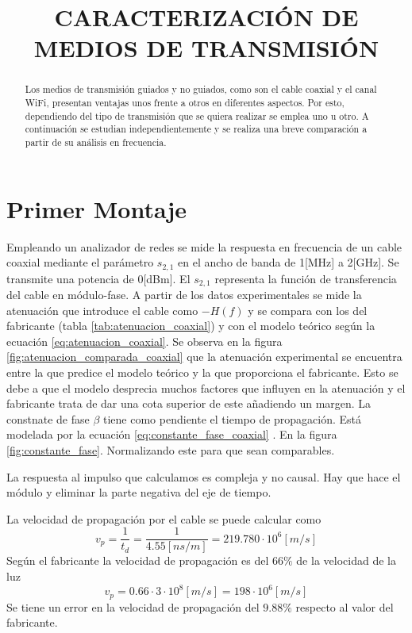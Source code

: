\documentclass[10pt,conference,a4paper]{IEEEtran}
\title{CARACTERIZACIÓN DE MEDIOS DE TRANSMISIÓN}
\author{
    \IEEEauthorblockN{Pablo Arrieta Nata, Daniel Iñigo Baños.}
    \IEEEauthorblockA{uo194468@uniovi.es, uo194823@uniovi.es.}
    \IEEEauthorblockA{Grado en Tecnologias y Servicios de Telecomunicación. Universidad de Oviedo.}
    \IEEEauthorblockA{Sistemas de Telecomunicación. Curso 2013-14.}
}
\begin{document}
\maketitle

\begin{abstract}
    Los medios de transmisión guiados y no guiados, como son el cable coaxial y el canal WiFi, presentan ventajas unos frente a otros en diferentes aspectos. Por esto, dependiendo del tipo de transmisión que se quiera realizar se emplea uno u otro. A continuación se estudian independientemente y se realiza una breve comparación a partir de su análisis en frecuencia.
\end{abstract}

\section{Primer Montaje}
Empleando un analizador de redes se mide la respuesta en frecuencia de un cable coaxial mediante el parámetro $s_{2,1}$ en el ancho de banda de 1[MHz] a 2[GHz]. Se transmite una potencia de 0[dBm]. El $s_{2,1}$ representa la función de transferencia del cable en módulo-fase.
A partir de los datos experimentales se mide la atenuación que introduce el cable como $-H(f)$ y se compara con los del fabricante (tabla \ref{tab:atenuacion_coaxial}) y con el modelo teórico según la ecuación \ref{eq:atenuacion_coaxial}.
Se observa en la figura \ref{fig:atenuacion_comparada_coaxial} que la atenuación experimental se encuentra entre la que predice el modelo teórico y la que proporciona el fabricante. Esto se debe a que el modelo desprecia muchos factores que influyen en la atenuación y el fabricante trata de dar una cota superior de este añadiendo un margen.
La constnate de fase $\beta$ tiene como pendiente el tiempo de propagación. Está modelada por la ecuación \ref{eq:constante_fase_coaxial} . En la figura \ref{fig:constante_fase}. Normalizando este para que sean comparables.

La respuesta al impulso que calculamos es compleja y no causal. Hay que hace el módulo y eliminar la parte negativa del eje de tiempo. 

La velocidad de propagación por el cable se puede calcular como $$v_p = \frac{1}{t_d} = \frac{1}{4.55 [ns/m]} = 219.780 \cdot 10^6 [m/s]$$
Según el fabricante la velocidad de propagación es del $66 \%$ de la velocidad de la luz $$v_p = 0.66 \cdot 3 \cdot 10^8 [m/s] =  198 \cdot 10^6 [m/s]$$ Se tiene un error en la velocidad de propagación del $9.88 \%$ respecto al valor del fabricante.
\end{document}

